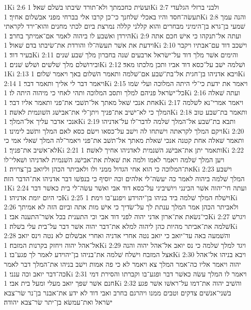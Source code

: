 1Ki 2:6  ועשׂית כחכמתך ולא־תורד שׂיבתו בשׁלם שׁאל׃
1Ki 2:7  ולבני ברזלי הגלעדי תעשׂה־חסד והיו באכלי שׁלחנך כי־כן קרבו אלי בברחי מפני אבשׁלום אחיך׃
1Ki 2:8  והנה עמך שׁמעי בן־גרא בן־הימיני מבחרים והוא קללני קללה נמרצת ביום לכתי מחנים והוא־ירד לקראתי הירדן ואשׁבע לו ביהוה לאמר אם־אמיתך בחרב׃
1Ki 2:9  ועתה אל־תנקהו כי אישׁ חכם אתה וידעת את אשׁר תעשׂה־לו והורדת את־שׂיבתו בדם שׁאול׃
1Ki 2:10  וישׁכב דוד עם־אבתיו ויקבר בעיר דוד׃
1Ki 2:11  והימים אשׁר מלך דוד על־ישׂראל ארבעים שׁנה בחברון מלך שׁבע שׁנים ובירושׁלם מלך שׁלשׁים ושׁלשׁ שׁנים׃
1Ki 2:12  ושׁלמה ישׁב על־כסא דוד אביו ותכן מלכתו מאד׃
1Ki 2:13  ויבא אדניהו בן־חגית אל־בת־שׁבע אם־שׁלמה ותאמר השׁלום באך ויאמר שׁלום׃
1Ki 2:14  ויאמר דבר לי אליך ותאמר דבר׃
1Ki 2:15  ויאמר את ידעת כי־לי היתה המלוכה ועלי שׂמו כל־ישׂראל פניהם למלך ותסב המלוכה ותהי לאחי כי מיהוה היתה לו׃
1Ki 2:16  ועתה שׁאלה אחת אנכי שׁאל מאתך אל־תשׁבי את־פני ותאמר אליו דבר׃
1Ki 2:17  ויאמר אמרי־נא לשׁלמה המלך כי לא־ישׁיב את־פניך ויתן־לי את־אבישׁג השׁונמית לאשׁה׃
1Ki 2:18  ותאמר בת־שׁבע טוב אנכי אדבר עליך אל־המלך׃
1Ki 2:19  ותבא בת־שׁבע אל־המלך שׁלמה לדבר־לו על־אדניהו ויקם המלך לקראתה וישׁתחו לה וישׁב על־כסאו וישׂם כסא לאם המלך ותשׁב לימינו׃
1Ki 2:20  ותאמר שׁאלה אחת קטנה אנכי שׁאלת מאתך אל־תשׁב את־פני ויאמר־לה המלך שׁאלי אמי כי לא־אשׁיב את־פניך׃
1Ki 2:21  ותאמר יתן את־אבישׁג השׁנמית לאדניהו אחיך לאשׁה׃
1Ki 2:22  ויען המלך שׁלמה ויאמר לאמו ולמה את שׁאלת את־אבישׁג השׁנמית לאדניהו ושׁאלי־לו את־המלוכה כי הוא אחי הגדול ממני ולו ולאביתר הכהן וליואב בן־צרויה׃
1Ki 2:23  וישׁבע המלך שׁלמה ביהוה לאמר כה יעשׂה־לי אלהים וכה יוסיף כי בנפשׁו דבר אדניהו את־הדבר הזה׃
1Ki 2:24  ועתה חי־יהוה אשׁר הכינני ויושׁיביני על־כסא דוד אבי ואשׁר עשׂה־לי בית כאשׁר דבר כי היום יומת אדניהו׃
1Ki 2:25  וישׁלח המלך שׁלמה ביד בניהו בן־יהוידע ויפגע־בו וימת׃
1Ki 2:26  ולאביתר הכהן אמר המלך ענתת לך על־שׂדיך כי אישׁ מות אתה וביום הזה לא אמיתך כי־נשׂאת את־ארון אדני יהוה לפני דוד אבי וכי התענית בכל אשׁר־התענה אבי׃
1Ki 2:27  ויגרשׁ שׁלמה את־אביתר מהיות כהן ליהוה למלא את־דבר יהוה אשׁר דבר על־בית עלי בשׁלה׃
1Ki 2:28  והשׁמעה באה עד־יואב כי יואב נטה אחרי אדניה ואחרי אבשׁלום לא נטה וינס יואב אל־אהל יהוה ויחזק בקרנות המזבח׃
1Ki 2:29  ויגד למלך שׁלמה כי נס יואב אל־אהל יהוה והנה אצל המזבח וישׁלח שׁלמה את־בניהו בן־יהוידע לאמר לך פגע־בו׃
1Ki 2:30  ויבא בניהו אל־אהל יהוה ויאמר אליו כה־אמר המלך צא ויאמר לא כי פה אמות וישׁב בניהו את־המלך דבר לאמר כה־דבר יואב וכה ענני׃
1Ki 2:31  ויאמר לו המלך עשׂה כאשׁר דבר ופגע־בו וקברתו והסירת דמי חנם אשׁר שׁפך יואב מעלי ומעל בית אבי׃
1Ki 2:32  והשׁיב יהוה את־דמו על־ראשׁו אשׁר פגע בשׁני־אנשׁים צדקים וטבים ממנו ויהרגם בחרב ואבי דוד לא ידע את־אבנר בן־נר שׂר־צבא ישׂראל ואת־עמשׂא בן־יתר שׂר־צבא יהודה׃
